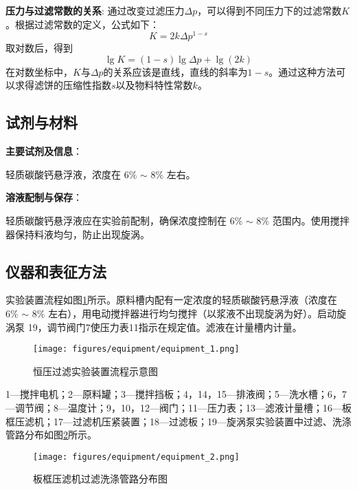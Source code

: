 \documentclass[UTF8,a4paper,fontset=none]{ctexart}
\begin{document}
\textbf{压力与过滤常数的关系}:
通过改变过滤压力$\Delta p$，可以得到不同压力下的过滤常数$K$。根据过滤常数的定义，公式如下：
\begin{equation}
K = 2k\Delta p^{1-s}
\end{equation}
取对数后，得到
\begin{equation}
\lg K = (1 - s)\lg \Delta p + \lg(2k)
\end{equation}
在对数坐标中，$K$与$\Delta p$的关系应该是直线，直线的斜率为$1-s$。通过这种方法可以求得滤饼的压缩性指数$s$以及物料特性常数$k$。

\subsection{试剂与材料}


\noindent\textbf{主要试剂及信息}：

轻质碳酸钙悬浮液，浓度在 $6\%$ $\sim$ $8\%$ 左右。

\noindent\textbf{溶液配制与保存}：

轻质碳酸钙悬浮液应在实验前配制，确保浓度控制在 $6\%$ $\sim$ $8\%$ 范围内。使用搅拌器保持料液均匀，防止出现旋涡。

\subsection{仪器和表征方法}


实验装置流程如图\ref{fig:equipment_1}所示。原料槽内配有一定浓度的轻质碳酸钙悬浮液（浓度在 $6\%$ $\sim$ $8\%$ 左右），用电动搅拌器进行均匀搅拌（以浆液不出现旋涡为好）。启动旋涡泵 19，调节阀门7使压力表11指示在规定值。滤液在计量槽内计量。

\begin{figure}[H]
    \centering
    \texttt{[image: figures/equipment/equipment\_1.png]}
    \caption{恒压过滤实验装置流程示意图}
    \label{fig:equipment_1}
\end{figure}

1—搅拌电机；2—原料罐；3—搅拌挡板；4，14，15—排液阀；5—洗水槽；6，7—调节阀；8—温度计；9，10，12—阀门；11—压力表；13—滤液计量槽；16—板框压滤机；17—过滤机压紧装置；18—过滤板；19—旋涡泵实验装置中过滤、洗涤管路分布如图\ref{fig:equipment_2}所示。

\begin{figure}[H]
    \centering
    \texttt{[image: figures/equipment/equipment\_2.png]}
    \caption{板框压滤机过滤洗涤管路分布图}
    \label{fig:equipment_2}
\end{figure}
\end{document}
